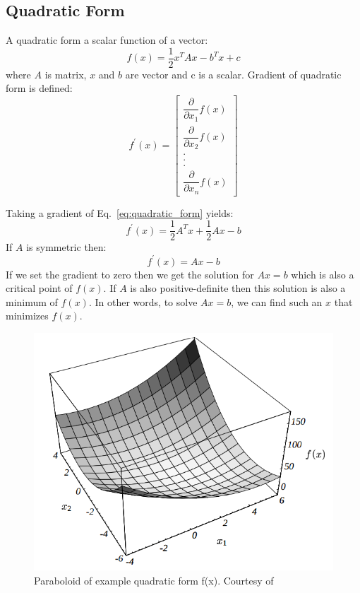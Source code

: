 \documentclass[en]{minipw} %
\begin{document}
\subsection{Quadratic Form}
A quadratic form a scalar function of a vector:
\begin{equation}
\label{eq:quadratic_form}
f(x) = \dfrac{1}{2}x^{T}Ax - b^{T}x + c
\end{equation}
where $A$ is matrix, $x$ and $b$ are vector and c is a scalar.
Gradient of quadratic form is defined:
\begin{equation}
\label{eq:gradient_f}
f^{'}(x) = 
\begin{bmatrix}
\dfrac{\partial}{\partial x_1} f(x) \\
\dfrac{\partial}{\partial x_2} f(x) \\
. \\
. \\
. \\
\dfrac{\partial}{\partial x_n} f(x)
\end{bmatrix}
\end{equation}

Taking a gradient of Eq.~\ref{eq:quadratic_form} yields:
\begin{equation}
f^{'}(x) = \dfrac{1}{2}A^{T}x + \dfrac{1}{2}Ax - b
\end{equation}
If $A$ is symmetric then:
\begin{equation}
f^{'}(x) = Ax - b
\end{equation}
If we set the gradient to zero then we get the solution for $Ax=b$ which is also a critical point of $f(x)$. If $A$ is also positive-definite then this solution is also a minimum of $f(x)$. In other words, to solve $Ax=b$, we can find such an $x$ that minimizes $f(x)$.

\begin{figure}[h!]
\centering
\includegraphics[scale=0.5]{pictures/paraboloid.png}
\caption[Paraboloid of quadratic form]{Paraboloid of example quadratic form f(x). Courtesy of~\cite{cg}}
\end{figure}
\end{document}
